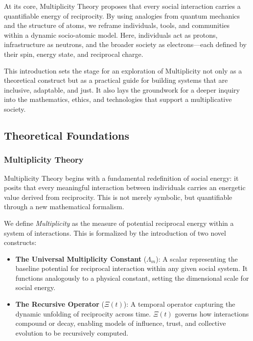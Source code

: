 \documentclass{article}
\theoremstyle{plain}
\theoremstyle{claimstyle}
\begin{document}
At its core, Multiplicity Theory proposes that every social interaction carries a quantifiable energy of reciprocity. By using analogies from quantum mechanics and the structure of atoms, we reframe individuals, tools, and communities within a dynamic socio-atomic model. Here, individuals act as protons, infrastructure as neutrons, and the broader society as electrons—each defined by their spin, energy state, and reciprocal charge.

This introduction sets the stage for an exploration of Multiplicity not only as a theoretical construct but as a practical guide for building systems that are inclusive, adaptable, and just. It also lays the groundwork for a deeper inquiry into the mathematics, ethics, and technologies that support a multiplicative society.

\subsection{Theoretical Foundations}

\subsubsection{Multiplicity Theory}

Multiplicity Theory begins with a fundamental redefinition of social energy: it posits that every meaningful interaction between individuals carries an energetic value derived from reciprocity. This is not merely symbolic, but quantifiable through a new mathematical formalism.

We define \textit{Multiplicity} as the measure of potential reciprocal energy within a system of interactions. This is formalized by the introduction of two novel constructs:

\begin{itemize}
    \item \textbf{The Universal Multiplicity Constant} ($\Lambda_m$): A scalar representing the baseline potential for reciprocal interaction within any given social system. It functions analogously to a physical constant, setting the dimensional scale for social energy.
    \item \textbf{The Recursive Operator} ($\Xi(t)$): A temporal operator capturing the dynamic unfolding of reciprocity across time. $\Xi(t)$ governs how interactions compound or decay, enabling models of influence, trust, and collective evolution to be recursively computed.
\end{itemize}
\end{document}
